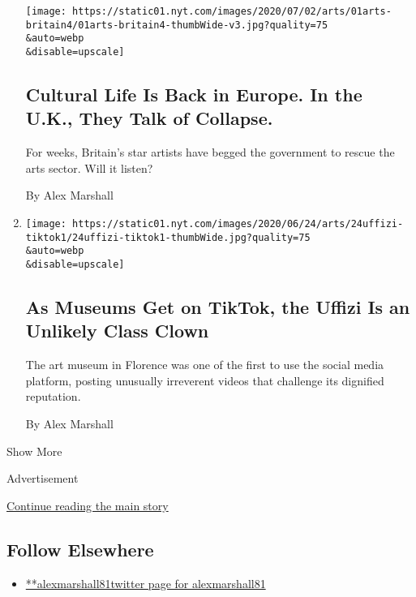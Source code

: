 \begin{enumerate}
  \texttt{[image: https://static01.nyt.com/images/2020/07/02/arts/01arts-britain4/01arts-britain4-thumbWide-v3.jpg?quality=75\\\&auto=webp\\\&disable=upscale]}

  \hypertarget{cultural-life-is-back-in-europe-in-the-uk-they-talk-of-collapse}{%
  \subsection{Cultural Life Is Back in Europe. In the U.K., They Talk of
  Collapse.}\label{cultural-life-is-back-in-europe-in-the-uk-they-talk-of-collapse}}

  For weeks, Britain's star artists have begged the government to rescue
  the arts sector. Will it listen?

  By Alex Marshall
\item
  \href{/2020/06/24/arts/design/uffizi-museums-tiktok.html}{}

  \texttt{[image: https://static01.nyt.com/images/2020/06/24/arts/24uffizi-tiktok1/24uffizi-tiktok1-thumbWide.jpg?quality=75\\\&auto=webp\\\&disable=upscale]}

  \hypertarget{as-museums-get-on-tiktok-the-uffizi-is-an-unlikely-class-clown}{%
  \subsection{As Museums Get on TikTok, the Uffizi Is an Unlikely Class
  Clown}\label{as-museums-get-on-tiktok-the-uffizi-is-an-unlikely-class-clown}}

  The art museum in Florence was one of the first to use the social
  media platform, posting unusually irreverent videos that challenge its
  dignified reputation.

  By Alex Marshall
\end{enumerate}

Show More

Advertisement

\protect\hyperlink{after-mid2}{Continue reading the main story}

\hypertarget{follow-elsewhere}{%
\subsection{Follow Elsewhere}\label{follow-elsewhere}}

\begin{itemize}
\tightlist
\item
  \href{https://twitter.com/alexmarshall81}{**alexmarshall81twitter page
  for alexmarshall81}
\end{itemize}

